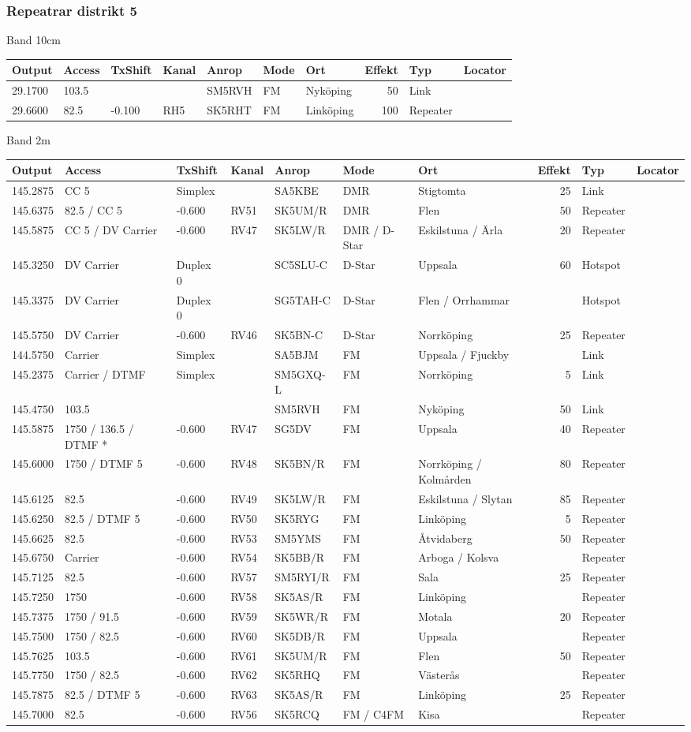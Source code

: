 \subsubsection{Repeatrar distrikt 5}
\large{Band 10cm}
\begin{longtable}{lllllllrlr}
Output & Access & TxShift & Kanal & Anrop & Mode & Ort & Effekt & Typ & Locator \\ \hline
29.1700&103.5&&&SM5RVH&FM&Nyköping&50&Link&\\
29.6600&82.5&-0.100&RH5&SK5RHT&FM&Linköping&100&Repeater&\\
\end{longtable}
\large{Band 2m}
\begin{longtable}{lllllllrlr}
Output & Access & TxShift & Kanal & Anrop & Mode & Ort & Effekt & Typ & Locator \\ \hline
145.2875&CC 5&Simplex&&SA5KBE&DMR&Stigtomta&25&Link&\\
145.6375&82.5 / CC 5&-0.600&RV51&SK5UM/R&DMR&Flen&50&Repeater&\\
145.5875&CC 5 / DV Carrier&-0.600&RV47&SK5LW/R&DMR / D-Star&Eskilstuna / Ärla&20&Repeater&\\
145.3250&DV Carrier&Duplex 0&&SC5SLU-C&D-Star&Uppsala&60&Hotspot&\\
145.3375&DV Carrier&Duplex 0&&SG5TAH-C&D-Star&Flen / Orrhammar&&Hotspot&\\
145.5750&DV Carrier&-0.600&RV46&SK5BN-C&D-Star&Norrköping&25&Repeater&\\
144.5750&Carrier&Simplex&&SA5BJM&FM&Uppsala / Fjuckby&&Link&\\
145.2375&Carrier / DTMF&Simplex&&SM5GXQ-L&FM&Norrköping&5&Link&\\
145.4750&103.5&&&SM5RVH&FM&Nyköping&50&Link&\\
145.5875&1750 / 136.5 / DTMF *&-0.600&RV47&SG5DV&FM&Uppsala&40&Repeater&\\
145.6000&1750 / DTMF 5&-0.600&RV48&SK5BN/R&FM&Norrköping / Kolmården&80&Repeater&\\
145.6125&82.5&-0.600&RV49&SK5LW/R&FM&Eskilstuna / Slytan&85&Repeater&\\
145.6250&82.5 / DTMF 5&-0.600&RV50&SK5RYG&FM&Linköping&5&Repeater&\\
145.6625&82.5&-0.600&RV53&SM5YMS&FM&Åtvidaberg&50&Repeater&\\
145.6750&Carrier&-0.600&RV54&SK5BB/R&FM&Arboga / Kolsva&&Repeater&\\
145.7125&82.5&-0.600&RV57&SM5RYI/R&FM&Sala&25&Repeater&\\
145.7250&1750&-0.600&RV58&SK5AS/R&FM&Linköping&&Repeater&\\
145.7375&1750 / 91.5&-0.600&RV59&SK5WR/R&FM&Motala&20&Repeater&\\
145.7500&1750 / 82.5&-0.600&RV60&SK5DB/R&FM&Uppsala&&Repeater&\\
145.7625&103.5&-0.600&RV61&SK5UM/R&FM&Flen&50&Repeater&\\
145.7750&1750 / 82.5&-0.600&RV62&SK5RHQ&FM&Västerås&&Repeater&\\
145.7875&82.5 / DTMF 5&-0.600&RV63&SK5AS/R&FM&Linköping&25&Repeater&\\
145.7000&82.5&-0.600&RV56&SK5RCQ&FM / C4FM&Kisa&&Repeater&\\
\end{longtable}
